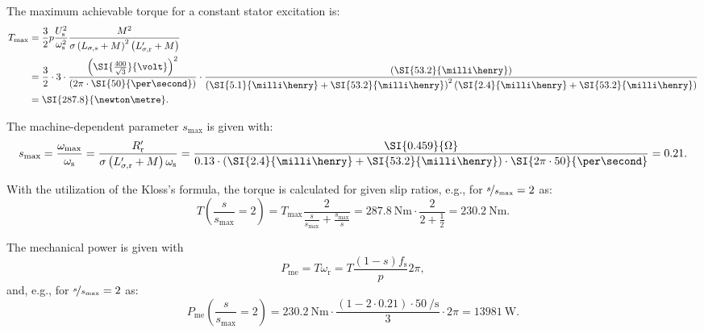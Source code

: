 \begin{solutionblock}
    The maximum achievable torque for a constant stator excitation is:
    \begin{align*}
        \begin{split}
            T_{\mathrm{max}} &= \frac{3}{2}p \frac{U_{\mathrm{s}}^2}{\omega_{\mathrm{s}}^2} \frac{M^2}{\sigma\left(L_{\sigma,s} + M \right)^2 \left(L_{\mathrm{\sigma,r}}'+M\right)}\\
            &= \frac{3}{2}\cdot 3 \cdot \frac{\left(\SI{\frac{400}{\sqrt{3}}}{\volt}\right)^2}{\left(2\pi\cdot\SI{50}{\per\second}\right)}\cdot \frac{\left(\SI{53.2}{\milli\henry}\right)}{\left(\SI{5.1}{\milli\henry}+ \SI{53.2}{\milli\henry}\right)^2\left(\SI{2.4}{\milli\henry}+ \SI{53.2}{\milli\henry}\right)}\\
            &= \SI{287.8}{\newton\metre}.
        \end{split}
    \end{align*} 

    The machine-dependent parameter $s_{\mathrm{max}}$ is given with:
    $$ s_{\mathrm{max}} = \frac{\omega_{\mathrm{max}}}{\omega_{\mathrm{s}}} = \frac{R_{\mathrm{r}}'}{\sigma \left(L_{\mathrm{\sigma,r}}'+ M \right)\omega_{\mathrm{s}}} = \frac{\SI{0.459}{\Omega}}{0.13\cdot \left(\SI{2.4}{\milli\henry} + \SI{53.2}{\milli\henry}\right)\cdot \SI{2\pi\cdot50}{\per\second}} = 0.21. $$

    
    With the utilization of the Kloss's formula, the torque is calculated for given slip ratios, e.g., for $\nicefrac{s}{s_\mathrm{max}} = 2$ as:
    $$ T\left(\frac{s}{s_{\mathrm{max}}}=2\right) = T_{\mathrm{max}} \frac{2}{\frac{s}{s_{\mathrm{max}}} + \frac{s_{\mathrm{max}}}{s}} = \SI{287.8}{\newton\metre}\cdot \frac{2}{2 + \frac{1}{2}} = \SI{230.2}{\newton\metre}. $$

    The mechanical power is given with
    $$ P_{\mathrm{me}} = T \omega_{\mathrm{r}} = T \frac{(1-s)f_{\mathrm{s}}}{p} 2\pi, $$
    and, e.g., for $\nicefrac{s}{s_\mathrm{max}} = 2$ as:
    $$ P_{\mathrm{me}}\left(\frac{s}{s_{\mathrm{max}}}=2\right) = \SI{230.2}{\newton\metre} \cdot \frac{\left(1-2\cdot0.21\right)\cdot \SI{50}{\per\second}}{3} \cdot 2\pi = \SI{13981}{\watt}.$$


\end{solutionblock}
